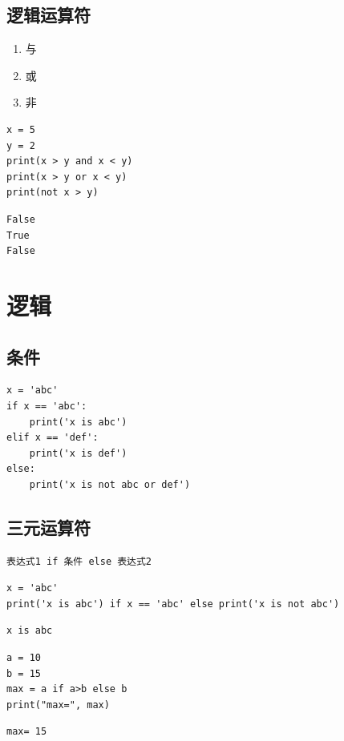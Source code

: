 \subsection{逻辑运算符}
\begin{enumerate}[label=\arabic*)]
    \item {} 与
    \item {} 或
    \item {} 非
\end{enumerate}

\begin{lstlisting}[style=pythonstyle]
x = 5
y = 2
print(x > y and x < y)
print(x > y or x < y)
print(not x > y)
\end{lstlisting} 
\begin{lstlisting}[style=demostyle,numbers=none]  
False
True
False
\end{lstlisting}


\section{逻辑}
\subsection{条件}
\begin{lstlisting}[style=pythonstyle]
x = 'abc'
if x == 'abc':
    print('x is abc')
elif x == 'def':
    print('x is def')
else:
    print('x is not abc or def')
\end{lstlisting}

\subsection{三元运算符}
\begin{lstlisting}[style=demostyle,numbers=none]  
表达式1 if 条件 else 表达式2
\end{lstlisting}

\begin{lstlisting}[style=pythonstyle]
x = 'abc'
print('x is abc') if x == 'abc' else print('x is not abc')
\end{lstlisting}
\begin{lstlisting}[style=demostyle,numbers=none] 
x is abc
\end{lstlisting}

\begin{lstlisting}[style=pythonstyle]
a = 10
b = 15
max = a if a>b else b
print("max=", max)
\end{lstlisting}
\begin{lstlisting}[style=demostyle,numbers=none] 
max= 15
\end{lstlisting}



